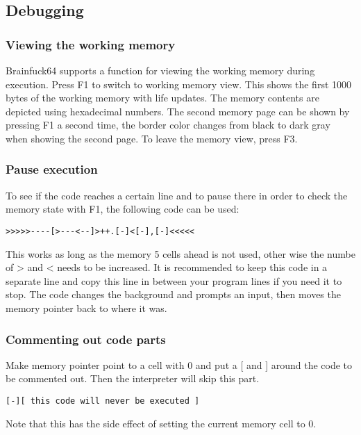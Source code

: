\documentclass[ms,article,a4paper]{memoir}
\begin{document}
\subsection{Debugging}

\subsubsection{Viewing the working memory}

Brainfuck64 supports a function for viewing the working memory during execution. Press F1 to switch to working memory view. This shows the first 1000 bytes of the working memory with life updates. The memory contents are depicted using hexadecimal numbers.
The second memory page can be shown by pressing F1 a second time, the border color changes from black to dark gray when showing the second page. To leave the memory view, press F3.

\subsubsection{Pause execution}

To see if the code reaches a certain line and to pause there in order to check the memory state with F1, the following code can be used:

\begin{verbatim}
>>>>>----[>---<--]>++.[-]<[-],[-]<<<<<
\end{verbatim}

This works as long as the memory 5 cells ahead is not used, other wise the numbe of > and < needs to be increased.
It is recommended to keep this code in a separate line and copy this line in between your program lines if you need it to stop. 
The code changes the background and prompts an input, then moves the memory pointer back to where it was.

\subsubsection{Commenting out code parts}

Make memory pointer point to a cell with 0 and put a [ and ] around the code to be commented out. Then the interpreter will skip this part.

\begin{verbatim}
[-][ this code will never be executed ]
\end{verbatim}

Note that this has the side effect of setting the current memory cell to 0. 
\end{document}
